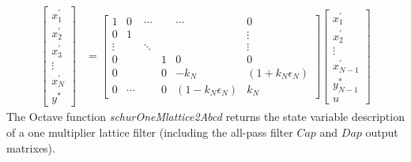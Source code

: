 \documentclass[a4paper,twoside,10pt,english]{report}
\begin{document}
\begin{align*}
\left[\begin{array}{c}
x_{1}^{\prime}\\
x_{2}^{\prime}\\
x_{3}^{\prime}\\
\vdots\\
x_{N}^{\prime}\\
y^{*}
\end{array}\right] & = \left[\begin{array}{cccccc}
1 & 0 & \cdots &  & \cdots & 0\\
0 & 1 &  &  &  & \vdots\\
\vdots &  & \ddots & & & \vdots\\
0 &  &  & 1 & 0 & 0\\
0 &  &  &  0 & -k_{N} & \left(1+k_{N}\epsilon_{N}\right)\\
0 & \cdots &  & 0 & \left(1-k_{N}\epsilon_{N}\right) & k_{N}
\end{array}\right]\left[\begin{array}{c}
x_{1}^{\prime}\\
x_{2}^{\prime}\\
\vdots\\
x_{N-1}^{\prime}\\
y_{N-1}^{*}\\
u
\end{array}\right]
\end{align*}
The Octave function \emph{schurOneMlattice2Abcd} returns the state variable
description of a one multiplier lattice filter (including the all-pass
filter $Cap$ and $Dap$ output matrixes).
\end{document}
